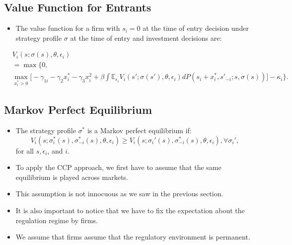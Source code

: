 \documentclass[
]{book}
\providecommand{\tightlist}{%
  \setlength{\itemsep}{0pt}\setlength{\parskip}{0pt}}
\begin{document}
\hypertarget{value-function-for-entrants}{%
\subsection{Value Function for Entrants}\label{value-function-for-entrants}}

\begin{itemize}
\tightlist
\item
  The value function for a firm with \(s_i = 0\) at the time of entry decision under strategy profile \(\sigma\) at the time of entry and investment decisions are:
\end{itemize}

\begin{equation}
\begin{split}
&V_i(s; \sigma(s), \theta, \epsilon_i)\\
&=\max\Bigg\{0, \\
&\max_{x_i^* > 0} \Bigg[ - \gamma_{1i} - \gamma_2 x_i^* - \gamma_3 x_i^2 + \beta \int \mathbb{E}_{\epsilon_i} V_i(s'; \sigma(s'), \theta, \epsilon_i) dP(s_i + x_i^*, s'_{-i}; s, \sigma(s))\Bigg] - \kappa_i\Bigg\}.
\end{split}
\end{equation}

\hypertarget{markov-perfect-equilibrium-1}{%
\subsection{Markov Perfect Equilibrium}\label{markov-perfect-equilibrium-1}}

\begin{itemize}
\tightlist
\item
  The strategy profile \(\sigma^*\) is a Markov perfect equilibrium if:
  \begin{equation}
  V_i(s; \sigma_i^*(s), \sigma_{-i}^*(s), \theta, \epsilon_i) \ge V_i(s; \sigma_i'(s), \sigma_{-i}^*(s), \theta, \epsilon_i), \forall \sigma_i',
  \end{equation}
  for all \(s, \epsilon_i\), and \(i\).
\item
  To apply the CCP approach, we first have to assume that the same equilibrium is played across markets.
\item
  This assumption is not innocuous as we saw in the previous section.
\item
  It is also important to notice that we have to fix the expectation about the regulation regime by firms.
\item
  We assume that firms assume that the regulatory environment is permanent.
\end{itemize}
\end{document}
